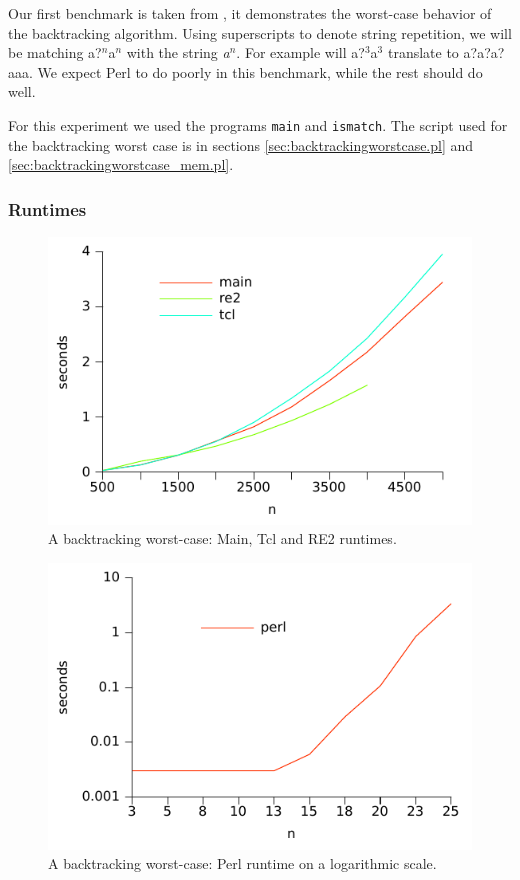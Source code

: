 Our first benchmark is taken from \cite{RussCox}, it demonstrates the
worst-case behavior of the backtracking algorithm. Using superscripts
to denote string repetition, we will be matching \textsf{a?$^n$a$^n$}
with the string \textsl{a$^n$}. For example will \textsf{a?$^3$a$^3$}
translate to \textsf{a?a?a?aaa}. We expect Perl to do poorly in this
benchmark, while the rest should do well.

For this experiment we used the programs \texttt{main} and
\texttt{ismatch}. The script used for the backtracking worst case is
in sections \vref{sec:backtrackingworstcase.pl} and
\vref{sec:backtrackingworstcase_mem.pl}.

\subsubsection{Runtimes}

\begin{figure}
\centering
\includegraphics{benchmarks/backtrackingworstcase_maintclre2_normal.pdf}
\caption{A backtracking worst-case: Main, Tcl and RE2 runtimes.}
\label{fig:backtrackingworstcase_maintclre2_normal}
\end{figure}

\begin{figure}
\centering
\includegraphics{benchmarks/backtrackingworstcase_perl_log.pdf}
\caption{A backtracking worst-case: Perl runtime on a logarithmic scale.}
\label{fig:backtrackingworstcase_perl_log}
\end{figure}

